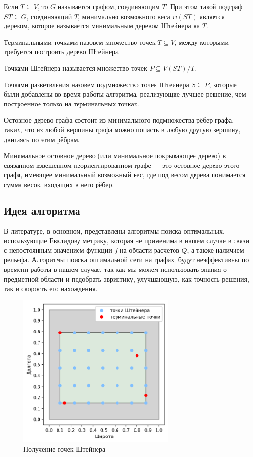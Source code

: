 Если $T \subseteq V$, то $G$ называется графом, соединяющим $T$. При этом такой подграф $ST \subseteq G$, соединяющий $T$, минимально возможного веса $w(ST)$ является деревом, которое называется минимальным деревом Штейнера на $T$.

Терминальными точками назовем множество точек  $T \subseteq V$, между которыми требуется построить дерево Штейнера.

Точками Штейнера называется множество точек $P \subseteq V(ST) / T$.

Точками разветвления назовем подмножество точек Штейнера $S \subseteq P$, которые были добавлены во время работы алгоритма, реализующие лучшее решение, чем построенное только на терминальных точках.

Остовное дерево графа состоит из минимального подмножества рёбер графа, таких, что из любой вершины графа можно попасть в любую другую вершину, двигаясь по этим рёбрам.

Минимальное остовное дерево (или минимальное покрывающее дерево) в связанном взвешенном неориентированном графе — это остовное дерево этого графа, имеющее минимальный возможный вес, где под весом дерева понимается сумма весов, входящих в него рёбер.

\subsection*{\Large{Идея алгоритма}}
В литературе, в основном, представлены алгоритмы поиска оптимальных, использующие Евклидову метрику, которая не применима в нашем случае в связи с непостоянным значением функции $f$ на области расчетов $Q$, а также наличием рельефа. Алгоритмы поиска оптимальной сети на графах, будут неэффективны по времени работы в нашем случае, так как мы можем использовать знания о предметной области и подобрать эвристику, улучшающую, как точность решения, так и скорость его нахождения.

\begin{figure}[H]
	\includegraphics[width=0.7\textwidth]{images/4_1.png}
	\caption{Получение точек Штейнера}
\end{figure}
\vskip 4mm

